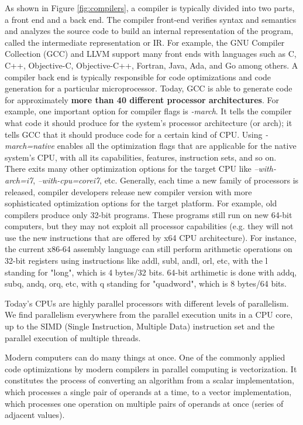 As shown in Figure \ref{fig:compilers}, a compiler is typically divided into two parts, a front end and a back end. The compiler front-end verifies syntax and semantics and analyzes the source code to build an internal representation of the program, called the intermediate representation or IR. For example, the GNU Compiler Collection (GCC) and LLVM support many front ends with languages such as C, C++, Objective-C, Objective-C++, Fortran, Java, Ada, and Go among others. 
A compiler back end is typically responsible for code optimizations and code generation for a particular microprocessor. Today, GCC is able to generate code for approximately \textbf{more than 40 different processor architectures}.
For example, one important option for compiler flags is \textit{-march}. It tells the compiler what code it should produce for the system's processor architecture (or arch); it tells GCC that it should produce code for a certain kind of CPU. Using \textit{-march=native} enables all the optimization flags that are applicable for the native system's CPU, with all its capabilities, features, instruction sets, and so on. There exits many other optimization options for the target CPU like \textit{--with-arch=i7}, \textit{--with-cpu=corei7}, etc.
Generally, each time a new family of processors is released, compiler developers release new compiler version with more sophisticated optimization options for the target platform. For example, old compilers produce only 32-bit programs. These programs still run on new 64-bit computers, but they may not exploit all processor capabilities (e.g. they will not use the new instructions that are offered by x64 CPU architecture). For instance, the current x86-64 assembly language can still perform arithmetic operations on 32-bit registers using instructions like addl, subl, andl, orl, etc, with the l standing for "long", which is 4 bytes/32 bits. 64-bit arthimetic is done with addq, subq, andq, orq, etc, with q standing for "quadword", which is 8 bytes/64 bits.


Today's CPUs are highly parallel processors with different levels of parallelism.
We find parallelism everywhere from the parallel execution units in a CPU core, up to the SIMD
(Single Instruction, Multiple Data) instruction set and the parallel execution of multiple
threads. 

Modern computers can do many things at once. One of the commonly applied code optimizations by modern compilers in parallel computing is vectorization. It constitutes the process of converting an algorithm from a scalar implementation, which processes a single pair of operands at a time, to a vector implementation, which processes one operation on multiple pairs of operands at once (series of adjacent values).

